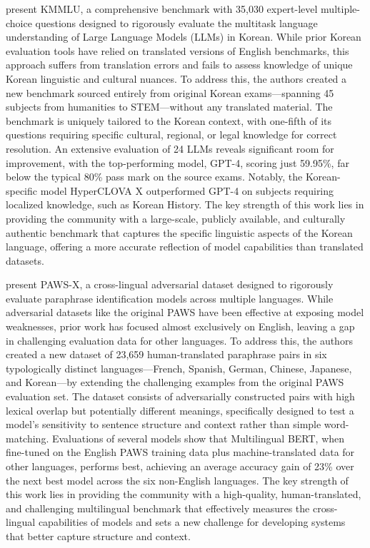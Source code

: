 \documentclass[acmsmall]{acmart}
\begin{document}
  \citep{son2024kmmlu} present KMMLU, a comprehensive benchmark with 35,030 expert-level multiple-choice questions designed to rigorously evaluate the multitask language understanding of Large Language Models (LLMs) in Korean. While prior Korean evaluation tools have relied on translated versions of English benchmarks, this approach suffers from translation errors and fails to assess knowledge of unique Korean linguistic and cultural nuances. To address this, the authors created a new benchmark sourced entirely from original Korean exams—spanning 45 subjects from humanities to STEM—without any translated material. The benchmark is uniquely tailored to the Korean context, with one-fifth of its questions requiring specific cultural, regional, or legal knowledge for correct resolution. An extensive evaluation of 24 LLMs reveals significant room for improvement, with the top-performing model, GPT-4, scoring just 59.95\%, far below the typical 80\% pass mark on the source exams. Notably, the Korean-specific model HyperCLOVA X outperformed GPT-4 on subjects requiring localized knowledge, such as Korean History. The key strength of this work lies in providing the community with a large-scale, publicly available, and culturally authentic benchmark that captures the specific linguistic aspects of the Korean language, offering a more accurate reflection of model capabilities than translated datasets.

  \citep{yang2019paws} present PAWS-X, a cross-lingual adversarial dataset designed to rigorously evaluate paraphrase identification models across multiple languages. While adversarial datasets like the original PAWS have been effective at exposing model weaknesses, prior work has focused almost exclusively on English, leaving a gap in challenging evaluation data for other languages. To address this, the authors created a new dataset of 23,659 human-translated paraphrase pairs in six typologically distinct languages—French, Spanish, German, Chinese, Japanese, and Korean—by extending the challenging examples from the original PAWS evaluation set. The dataset consists of adversarially constructed pairs with high lexical overlap but potentially different meanings, specifically designed to test a model's sensitivity to sentence structure and context rather than simple word-matching. Evaluations of several models show that Multilingual BERT, when fine-tuned on the English PAWS training data plus machine-translated data for other languages, performs best, achieving an average accuracy gain of 23\% over the next best model across the six non-English languages. The key strength of this work lies in providing the community with a high-quality, human-translated, and challenging multilingual benchmark that effectively measures the cross-lingual capabilities of models and sets a new challenge for developing systems that better capture structure and context.
\end{document}
